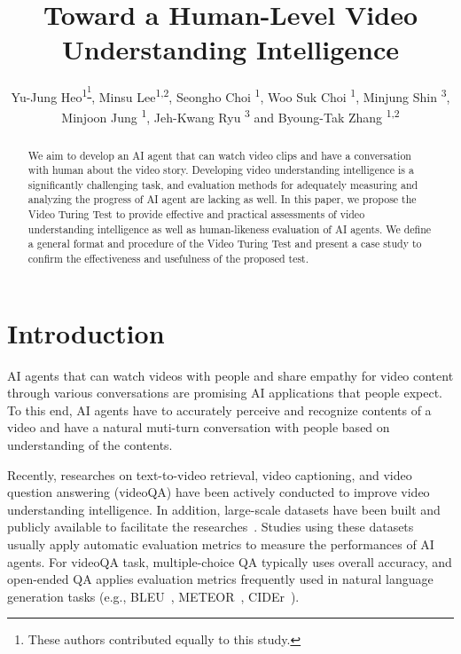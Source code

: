 \documentclass[letterpaper]{article} %
\title{Toward a Human-Level Video Understanding Intelligence}
\author {
    Yu-Jung Heo\textsuperscript{\rm 1\thanks{These authors contributed equally to this study.}},
    Minsu Lee\textsuperscript{\rm 1,2\footnotemark[1]},
    Seongho Choi \textsuperscript{\rm 1},
    Woo Suk Choi \textsuperscript{\rm 1},
    Minjung Shin \textsuperscript{\rm 3},
    Minjoon Jung \textsuperscript{\rm 1},
    Jeh-Kwang Ryu \textsuperscript{\rm 3} and
    Byoung-Tak Zhang \textsuperscript{\rm 1,2}\\
}
\begin{document}
\maketitle

\begin{abstract}
We aim to develop an AI agent that can watch video clips and have a conversation with human about the video story. Developing video understanding intelligence is a significantly challenging task, and evaluation methods for adequately measuring and analyzing the progress of AI agent are lacking as well.
In this paper, we propose the Video Turing Test to provide effective and practical assessments of video understanding intelligence as well as human-likeness evaluation of AI agents. We define a general format and procedure of the Video Turing Test and present a case study to confirm the effectiveness and usefulness of the proposed test.
\end{abstract}

\section{Introduction} %
AI agents that can watch videos with people and share empathy for video content through various conversations are promising AI applications that people expect. To this end, AI agents have to accurately perceive and recognize contents of a video and have a natural muti-turn conversation with people based on understanding of the contents.

Recently, researches on text-to-video retrieval, video captioning, and video question answering (videoQA) have been actively conducted to improve video understanding intelligence. In addition, large-scale datasets have been built and publicly available to facilitate the researches~\cite{alamri2019audio,lei2018tvqa,lei2020tvr,choi2021dramaqa}. Studies using these datasets usually apply automatic evaluation metrics to measure the performances of AI agents. 
For videoQA task, multiple-choice QA typically uses overall accuracy, and open-ended QA applies evaluation metrics frequently used in natural language generation tasks (e.g., BLEU~\cite{papineni2002bleu}, METEOR~\cite{banerjee2005meteor}, CIDEr~\cite{vedantam2015cider}).
\end{document}
